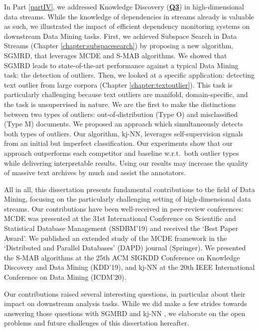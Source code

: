 In Part \ref{partIV}, we addressed Knowledge Discovery (\hyperlink{Q3}{\textbf{Q3}}) in high-dimensional data streams. While the knowledge of dependencies in streams already is valuable as such, we illustrated the impact of efficient dependency monitoring systems on downstream Data Mining tasks. First, we achieved Subspace Search in Data Streams (Chapter \ref{chapter:subspacesearch}) by proposing a new algorithm, \gls{SGMRD}, that leverages \gls{MCDE} and \gls{S-MAB} algorithms. We  showed that  \gls{SGMRD} leads to state-of-the-art performance against a typical Data Mining task: the detection of outliers. 
Then, we looked at a specific application: detecting text outlier from large corpora (Chapter \ref{chapter:textoutlier}). This task is particularly challenging because text outliers are manifold, domain-specific, and the task is unsupervised in nature. We are the first to make the distinctions between two types of outliers: out-of-distribution (Type O) and misclassified (Type M) documents. We proposed an approach which simultaneously detects both types of outliers. Our algorithm, \gls{kj-NN}, leverages self-supervision signals from an initial but imperfect classification. Our experiments show that our approach outperforms each competitor and baseline w.r.t.\ both outlier types while delivering interpretable results. Using our results may increase the quality of massive text archives by much and assist the annotators.  

All in all, this dissertation presents fundamental contributions to the field of Data Mining, focusing on the particularly challenging setting of high-dimensional data streams. Our contributions have been well-received in peer-review conferences: \gls{MCDE} \cite{DBLP:conf/ssdbm/FoucheB19} was presented at the 31st International Conference on Scientific and Statistical Database Management (SSDBM'19) and received the `Best Paper Award'. We published an extended study of the \gls{MCDE} framework \cite{DBLP:conf/ssdbm/FoucheBMKB20} in the `Distributed and Parallel Databases' (DAPD) journal (Springer). We presented the \gls{S-MAB} \cite{DBLP:conf/kdd/FoucheKB19} algorithms at the 25th ACM SIGKDD Conference on Knowledge Discovery and Data Mining (KDD'19), and \gls{kj-NN} \cite{DBLP:conf/ssdbm/FoucheMGZBH20} at the 20th IEEE International Conference on Data Mining (ICDM'20). 

Our contributions raised several interesting questions, in particular about their impact on downstream analysis tasks. While we did make a few strides towards answering those questions with \gls{SGMRD} \cite{DBLP:conf/review/FoucheKB20} and \gls{kj-NN} \cite{DBLP:conf/ssdbm/FoucheMGZBH20}, we elaborate on the open problems and future challenges of this dissertation hereafter. 

